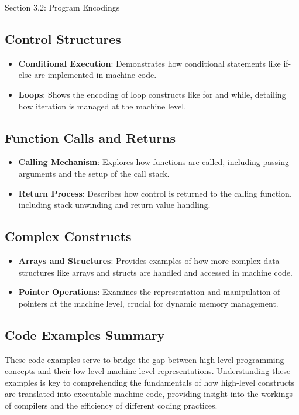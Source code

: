 \begin{notes}{Section 3.2: Program Encodings}
    \subsection*{Control Structures}
    
    \begin{itemize}
        \item \textbf{Conditional Execution}: Demonstrates how conditional statements like if-else are implemented in machine code.
        \item \textbf{Loops}: Shows the encoding of loop constructs like for and while, detailing how iteration is managed at the machine level.
    \end{itemize}
    
    \subsection*{Function Calls and Returns}
    
    \begin{itemize}
        \item \textbf{Calling Mechanism}: Explores how functions are called, including passing arguments and the setup of the call stack.
        \item \textbf{Return Process}: Describes how control is returned to the calling function, including stack unwinding and return value handling.
    \end{itemize}
    
    \subsection*{Complex Constructs}
    
    \begin{itemize}
        \item \textbf{Arrays and Structures}: Provides examples of how more complex data structures like arrays and structs are handled and accessed in machine code.
        \item \textbf{Pointer Operations}: Examines the representation and manipulation of pointers at the machine level, crucial for dynamic memory management.
    \end{itemize}
    
    \subsection*{Code Examples Summary}
    
    These code examples serve to bridge the gap between high-level programming concepts and their low-level machine-level representations. Understanding these examples is key to comprehending the 
    fundamentals of how high-level constructs are translated into executable machine code, providing insight into the workings of compilers and the efficiency of different coding practices.
\end{notes}